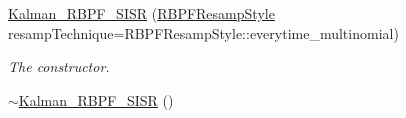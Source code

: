 \begin{DoxyCompactItemize}
\item 
\hyperlink{classKalman__RBPF__SISR_ae744655ada73d67c950c9f268dc3a171}{Kalman\+\_\+\+R\+B\+P\+F\+\_\+\+S\+I\+SR} (\hyperlink{kalman__rbpf__bs_8h_ad3790b392be9413a27de33728aad31e2}{R\+B\+P\+F\+Resamp\+Style} resamp\+Technique=R\+B\+P\+F\+Resamp\+Style\+::everytime\+\_\+multinomial)
\begin{DoxyCompactList}\small\item\em The constructor. \end{DoxyCompactList}\item 
\hyperlink{classKalman__RBPF__SISR_a86983cc90205aa350fa42464f37654ff}{$\sim$\+Kalman\+\_\+\+R\+B\+P\+F\+\_\+\+S\+I\+SR} ()\hypertarget{classKalman__RBPF__SISR_a86983cc90205aa350fa42464f37654ff}{}\label{classKalman__RBPF__SISR_a86983cc90205aa350fa42464f37654ff}


\end{DoxyCompactItemize}
